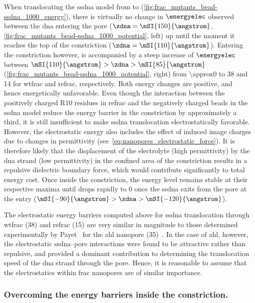 When translocating the \gls{ssdna} model from \cisi{} to \transi{}
(\cref{fig:frac_mutants_bead-ssdna_1000_energy}), there is virtually no change in $\energyelec$ observed
between the \gls{dna} entering the pore ($\zdna = \mSI{150}{\angstrom}$,
\cref{fig:frac_mutants_bead-ssdna_1000_potential}, left) up until the moment it reaches the top of the
constriction ($\zdna = \mSI{110}{\angstrom}$). Entering the constriction however, is accompanied by a steep
increase of $\energyelec$ between $ \mSI{110}{\angstrom} > \zdna > \mSI{85}{\angstrom}$
(\cref{fig:frac_mutants_bead-ssdna_1000_potential}, right) from \SI{\approx0}{\kT} to \SI{38}{\kT} and
\SI{14}{\kT} for \gls{wtfrac} and \gls{refrac}, respectively. Both energy changes are positive, and hence
energetically unfavorable. Even though the interaction between the positively charged R10 residues in
\gls{refrac} and the negatively charged beads in the \gls{ssdna} model reduce the energy barrier in the
constriction by approximately a third, it is still insufficient to make \gls{ssdna} translocation
electrostatically favorable. However, the electrostatic energy also includes the effect of induced image
charges due to changes in permittivity (see~\cref{eq:nanopores_electrostatic_force}). It is therefore likely
that the displacement of the electrolyte (high permittivity) by the \gls{dna} strand (low permittivity) in the
confined area of the constriction results in a repulsive dielectric boundary force, which would contribute
significantly to total energy cost. Once inside the constriction, the energy level remains stable at their
respective maxima until drops rapidly to \SI{0}{\kT} once the \gls{ssdna} exits from the pore at the \transi{}
entry ($\mSI{-90}{\angstrom} > \zdna > \mSI{-120}{\angstrom}$).

The electrostatic energy barriers computed above for \gls{ssdna} translocation through \gls{wtfrac}
(\SI{38}{\kT}) and \gls{refrac} (\SI{15}{\kT}) are very similar in magnitude to those determined
experimentally by Payet~\etal{} for the \gls{ahl} nanopore (\SI{35}{\kT})~\cite{Payet-2015}. In the case of
\gls{ahl}, however, the electrostatic \gls{ssdna}--pore interactions were found to be attractive rather than
repulsive, and provided a dominant contribution to determining the translocation speed of the \gls{dna} strand
through the pore. Hence, it is reasonable to assume that the electrostatics within \gls{frac} nanopores are of
similar importance.

\subsubsection{Overcoming the energy barriers inside the constriction.}
%

